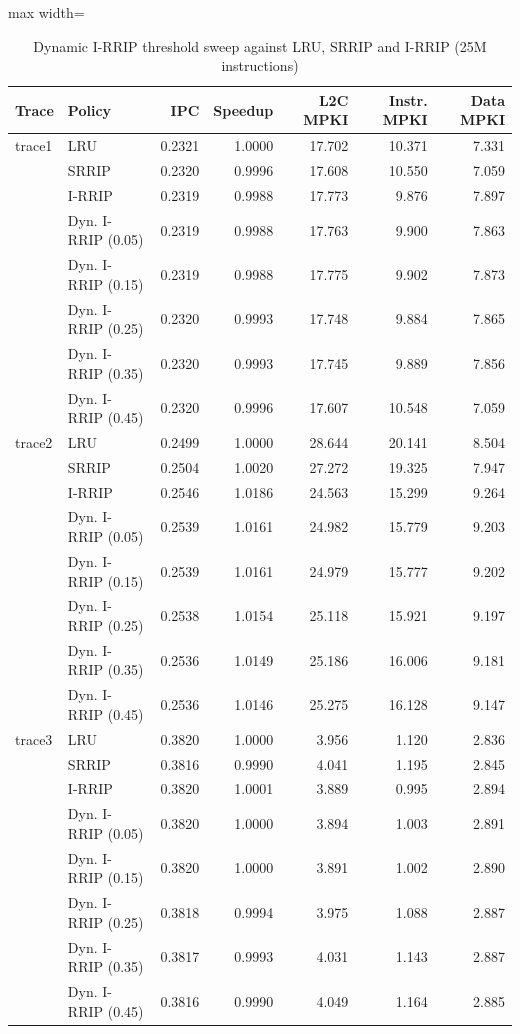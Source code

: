 \begin{table}[t]
\centering
\caption{Dynamic I-RRIP threshold sweep against LRU, SRRIP and I-RRIP (25M instructions)}
\label{tab:task2b}
\footnotesize
\setlength{\tabcolsep}{3pt}
\begin{adjustbox}{max width=\linewidth}
\begin{tabular}{llrrrrr}
\toprule
Trace & Policy & IPC & Speedup & L2C MPKI & Instr. MPKI & Data MPKI \\
\midrule
trace1 & LRU & 0.2321 & 1.0000 & 17.702 & 10.371 & 7.331 \\
 & SRRIP & 0.2320 & 0.9996 & 17.608 & 10.550 & 7.059 \\
 & I-RRIP & 0.2319 & 0.9988 & 17.773 & 9.876 & 7.897 \\
 & Dyn. I-RRIP (0.05) & 0.2319 & 0.9988 & 17.763 & 9.900 & 7.863 \\
 & Dyn. I-RRIP (0.15) & 0.2319 & 0.9988 & 17.775 & 9.902 & 7.873 \\
 & Dyn. I-RRIP (0.25) & 0.2320 & 0.9993 & 17.748 & 9.884 & 7.865 \\
 & Dyn. I-RRIP (0.35) & 0.2320 & 0.9993 & 17.745 & 9.889 & 7.856 \\
 & Dyn. I-RRIP (0.45) & 0.2320 & 0.9996 & 17.607 & 10.548 & 7.059 \\
\midrule
trace2 & LRU & 0.2499 & 1.0000 & 28.644 & 20.141 & 8.504 \\
 & SRRIP & 0.2504 & 1.0020 & 27.272 & 19.325 & 7.947 \\
 & I-RRIP & 0.2546 & 1.0186 & 24.563 & 15.299 & 9.264 \\
 & Dyn. I-RRIP (0.05) & 0.2539 & 1.0161 & 24.982 & 15.779 & 9.203 \\
 & Dyn. I-RRIP (0.15) & 0.2539 & 1.0161 & 24.979 & 15.777 & 9.202 \\
 & Dyn. I-RRIP (0.25) & 0.2538 & 1.0154 & 25.118 & 15.921 & 9.197 \\
 & Dyn. I-RRIP (0.35) & 0.2536 & 1.0149 & 25.186 & 16.006 & 9.181 \\
 & Dyn. I-RRIP (0.45) & 0.2536 & 1.0146 & 25.275 & 16.128 & 9.147 \\
\midrule
trace3 & LRU & 0.3820 & 1.0000 & 3.956 & 1.120 & 2.836 \\
 & SRRIP & 0.3816 & 0.9990 & 4.041 & 1.195 & 2.845 \\
 & I-RRIP & 0.3820 & 1.0001 & 3.889 & 0.995 & 2.894 \\
 & Dyn. I-RRIP (0.05) & 0.3820 & 1.0000 & 3.894 & 1.003 & 2.891 \\
 & Dyn. I-RRIP (0.15) & 0.3820 & 1.0000 & 3.891 & 1.002 & 2.890 \\
 & Dyn. I-RRIP (0.25) & 0.3818 & 0.9994 & 3.975 & 1.088 & 2.887 \\
 & Dyn. I-RRIP (0.35) & 0.3817 & 0.9993 & 4.031 & 1.143 & 2.887 \\
 & Dyn. I-RRIP (0.45) & 0.3816 & 0.9990 & 4.049 & 1.164 & 2.885 \\
\bottomrule
\end{tabular}
\end{adjustbox}
\end{table}
